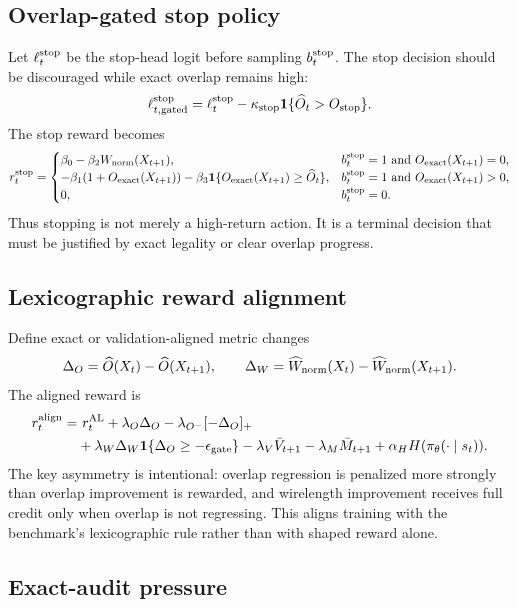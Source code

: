 \documentclass[11pt]{article}
\newcommand{\one}{\mathbf{1}}
\newcommand{\ExactOv}{O_{\rm exact}}
\newcommand{\WireNorm}{W_{\rm norm}}
\begin{document}
\subsection{Overlap-gated stop policy}

Let $\ell_t^{\rm stop}$ be the stop-head logit before sampling $b_t^{\rm stop}$. The stop decision should be discouraged while exact overlap remains high:
\[
    \ell_{t,{\rm gated}}^{\rm stop}
    =\ell_t^{\rm stop}
    -\kappa_{\rm stop}\one\{\widehat O_t>O_{\rm stop}\}.
\]
The stop reward becomes
\[
    r_t^{\rm stop}=\begin{cases}
    \beta_0-\beta_2\WireNorm(X_{t+1}),
        & b_t^{\rm stop}=1\ \text{and}\ \ExactOv(X_{t+1})=0,\\
    -\beta_1(1+\ExactOv(X_{t+1}))
    -\beta_3\one\{\ExactOv(X_{t+1})\ge \widehat O_t\},
        & b_t^{\rm stop}=1\ \text{and}\ \ExactOv(X_{t+1})>0,\\
    0, & b_t^{\rm stop}=0.
\end{cases}
\]
Thus stopping is not merely a high-return action. It is a terminal decision that must be justified by exact legality or clear overlap progress.

\subsection{Lexicographic reward alignment}

Define exact or validation-aligned metric changes
\[
    \Delta_O=\widehat O(X_t)-\widehat O(X_{t+1}),
    \qquad
    \Delta_W=\widehat W_{\rm norm}(X_t)-\widehat W_{\rm norm}(X_{t+1}).
\]
The aligned reward is
\[
\begin{aligned}
    r_t^{\rm align}
    =&\ r_t^{\rm AL}
    +\lambda_O\Delta_O
    -\lambda_{O^-}[-\Delta_O]_+ \\
    &+\lambda_W\Delta_W\one\{\Delta_O\ge -\epsilon_{\rm gate}\}
    -\lambda_V\bar V_{t+1}
    -\lambda_M\bar M_{t+1}
    +\alpha_H H(\pi_\theta(\cdot\mid s_t)).
\end{aligned}
\]
The key asymmetry is intentional: overlap regression is penalized more strongly than overlap improvement is rewarded, and wirelength improvement receives full credit only when overlap is not regressing. This aligns training with the benchmark's lexicographic rule rather than with shaped reward alone.

\subsection{Exact-audit pressure}
\end{document}
